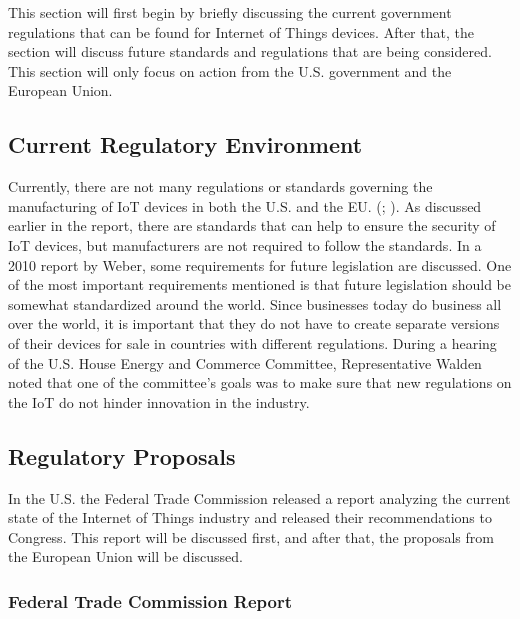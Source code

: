 \documentclass[letterpaper, 12pt]{article}
\begin{document}
\begin{flushleft}
This section will first begin by briefly discussing the current government regulations that can be found for Internet of Things devices. After that,
the section will discuss future standards and regulations that are being considered. This section will only focus on action from the U.S. government and the European Union.

\subsection*{Current Regulatory Environment}

Currently, there are not many regulations or standards governing the manufacturing of IoT devices in both the U.S. and the EU. (\cite{Weber201023}; \cite{housecyberattacks}).  As discussed earlier in the report, there are standards that can help to ensure the security of IoT devices, but manufacturers are
not required to follow the standards. In a 2010 report by Weber, some requirements for future legislation are discussed. One of the most important 
requirements mentioned is that future legislation should be somewhat standardized around the world. Since businesses today do business all over the world,
it is important that they do not have to create separate versions of their devices for sale in countries with different regulations. During a hearing of the
U.S. House Energy and Commerce Committee, Representative Walden noted that one of the committee's goals was to make sure that new regulations on the IoT do not hinder innovation in the industry. 

\subsection*{Regulatory Proposals}

In the U.S. the Federal Trade Commission released a report analyzing the current state of the Internet of Things industry and released their recommendations
to Congress. This report will be discussed first, and after that, the proposals from the European Union will be discussed.

\subsubsection*{Federal Trade Commission Report}


\end{flushleft}
\end{document}
